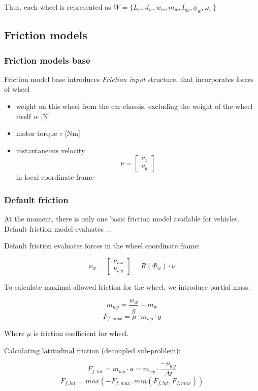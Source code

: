\documentclass[a4paper,11pt]{article}
\begin{document}
Thus, each wheel is represented as $W = \{L_w, d_w, w_w, m_w, I_{yy}, \phi_w, \omega_w\}$

\subsection{Friction models}
\subsubsection{Friction models base}
Friction model base introduces \textit{Friction input} structure, that incorporates forces of wheel
\begin{itemize}
\item weight on this wheel from the car chassis, excluding the weight of the wheel itself $w$ [N]
\item motor torque $\tau$ [Nm]
\item instantaneous velocity 
\[\nu = \begin{bmatrix}
\nu_x \\
\nu_y
\end{bmatrix}\] in local coordinate frame
\end{itemize}

\subsubsection{Default friction}
At the moment, there is only one basic friction model available for vehicles.
Default friction model evaluates ...

Default friction evaluates forces in the wheel coordinate frame:

\begin{center}
\[
\nu_w = 
\begin{bmatrix}
\nu_{wx} \\
\nu_{wy}
\end{bmatrix}
=R(\Phi_w) \cdot \nu
\]
\end{center}

To calculate maximal allowed friction for the wheel, we introduce partial mass:
\begin{center}
\[
m_{wp} = \frac{w_w}{g} + m_w
\]
\[
F_{f, max} = \mu \cdot m_{wp} \cdot g
\]
\end{center}
Where $\mu$ is friction coefficient for wheel.

Calculating latitudinal friction (decoupled sub-problem):
\begin{center}
\[
F_{f,lat} = m_{wp} \cdot a = m_{wp} \cdot \frac{-\nu_{wy}}{\Delta t}
\]
\[
F_{f,lat} = max(-F_{f,max}, min(F_{f,lat}, F_{f,max}))
\]
\end{center}
\end{document}
